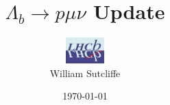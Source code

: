 \documentclass{beamer}
\begin{document}
{


\title[  $\Lambda_{b} \rightarrow p \mu \nu$ Update \hspace{2em}\insertframenumber/
\inserttotalframenumber]{$\Lambda_{b} \rightarrow p \mu \nu$ Update }
\author[William Sutcliffe]{\includegraphics[height=1cm,width=1.5cm]{lhcblogo.jpg} \\ William Sutcliffe}

\date{\today}

 \frame{\titlepage

} 









}
\end{document}
